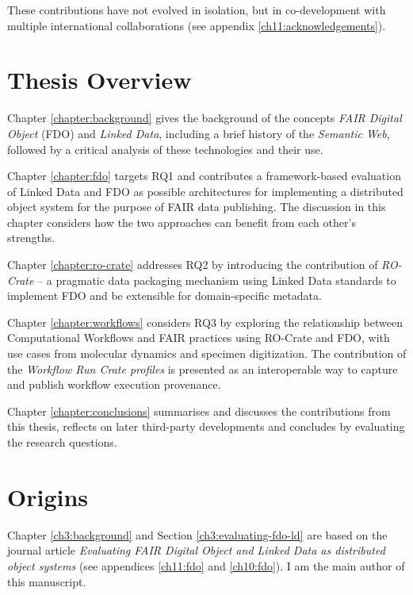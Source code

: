 These contributions have not evolved in isolation, but in co-development with multiple international collaborations (see appendix \vref{ch11:acknowledgements}).


\section{Thesis Overview}
\label{intro:overview}

Chapter \vref{chapter:background} gives the background of the concepts \emph{FAIR Digital Object} (FDO) and \emph{Linked Data}, including a brief history of the \emph{Semantic Web}, followed by a critical analysis of these technologies and their use. 

Chapter \vref{chapter:fdo} targets RQ1 and contributes a framework-based evaluation of Linked Data and FDO as possible architectures for implementing a distributed object system for the purpose of FAIR data publishing. The discussion in this chapter considers how the two approaches can benefit from each other's strengths. 

Chapter \vref{chapter:ro-crate} addresses RQ2 by introducing the contribution of \emph{RO-Crate} -- a pragmatic data packaging mechanism using Linked Data standards to implement FDO and be extensible for domain-specific metadata.  

Chapter \vref{chapter:workflows} considers RQ3 by exploring the relationship between Computational Workflows and FAIR practices using RO-Crate and FDO, with use cases from molecular dynamics and specimen digitization. The contribution of the \emph{Workflow Run Crate profiles} is presented as an interoperable way to capture and publish workflow execution provenance. 

Chapter \vref{chapter:conclusions} summarises and discusses the contributions from this thesis, reflects on later third-party developments and concludes by evaluating the research questions.


\section{Origins}
\label{intro:origins}

Chapter \ref{ch3:background} and Section \ref{ch3:evaluating-fdo-ld} are based on the journal article \emph{Evaluating FAIR Digital Object and Linked Data as distributed object systems} \cite{Soiland-Reyes 2024b}  (see appendices \ref{ch11:fdo} and \ref{ch10:fdo}). I am the main author of this manuscript.

